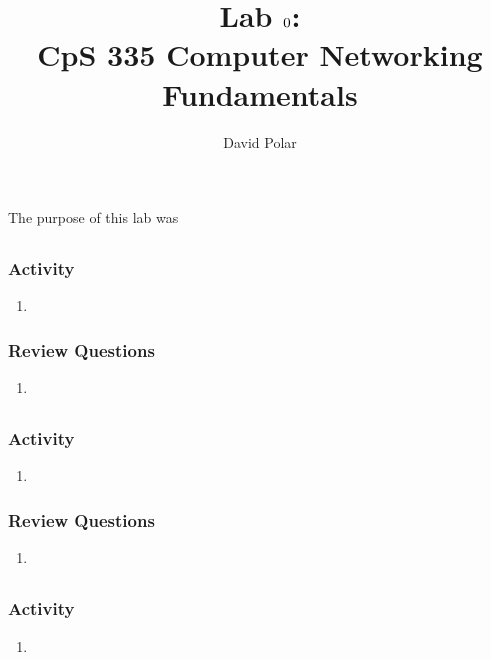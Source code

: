 \documentclass[12pt, draft]{article}
\title{Lab \( \labNum \): %
       \\CpS 335 Computer Networking Fundamentals}
\author{David Polar}
\date{}
\newcommand\labNum{0}
\begin{document}
\maketitle
{}
\setcounter{section}{\labNum}

The purpose of this lab was

\subsection{}

\subsubsection{Activity}
\begin{enumerate}
\item 
\end{enumerate}

\subsubsection{Review Questions}
\begin{enumerate}
\item 
\end{enumerate}

\subsection{}

\subsubsection{Activity}
\begin{enumerate}
\item 
\end{enumerate}

\subsubsection{Review Questions}
\begin{enumerate}
\item 
\end{enumerate}

\subsection{}

\subsubsection{Activity}
\begin{enumerate}
\item 
\end{enumerate}
\end{document}
